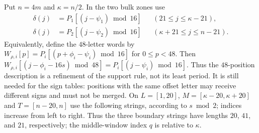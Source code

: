 Put $n=4m$ and $\kappa=n/2$.  In the two bulk zones use
\[
\begin{aligned}
\delta(j)&=P_1[(j-\psi_1)\bmod16]&& (21\le j\le\kappa-21),\\
\delta(j)&=P_2[(j-\psi_2)\bmod16]&& (\kappa+21\le j\le n-21).
\end{aligned}
\]
Equivalently, define the $48$-letter words by
$W_{\rho,i}[p]=P_i[(p+\phi_i-\psi_i)\bmod16]$ for $0\le p<48$.
Then $W_{\rho,i}[(j-\phi_i-16s)\bmod48]=P_i[(j-\psi_i)\bmod16]$.
Thus the $48$-position description is a refinement of the support rule, not its least period.
It is still needed for the sign tables: positions with the same offset letter may receive
different signs and must not be merged.
On $L=[1,20]$, $M=[\kappa-20,\kappa+20]$ and $T=[n-20,n]$ use
the following strings, according to $s\bmod2$; indices increase from left to right.
Thus the three boundary strings have lengths $20$, $41$, and $21$, respectively;
the middle-window index $q$ is relative to $\kappa$.
\begingroup\scriptsize
